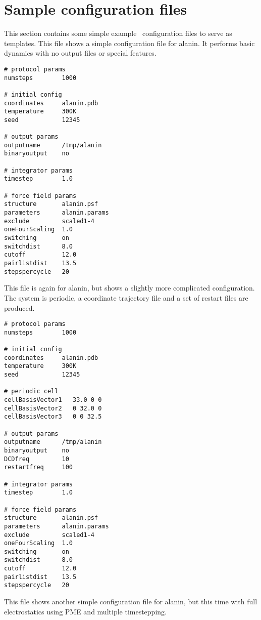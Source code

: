 \section{Sample configuration files}
\label{section:sample}
This section contains some simple example \NAMD\ configuration files to serve
as templates.
\prettypar
This file shows a simple configuration file for alanin.  
It performs basic dynamics
with no output files or special features.

\begin{verbatim}
# protocol params
numsteps        1000

# initial config
coordinates     alanin.pdb
temperature     300K
seed            12345

# output params
outputname      /tmp/alanin
binaryoutput    no

# integrator params
timestep        1.0

# force field params
structure       alanin.psf
parameters      alanin.params
exclude         scaled1-4
oneFourScaling  1.0
switching       on
switchdist      8.0
cutoff          12.0
pairlistdist    13.5
stepspercycle   20
\end{verbatim}

\newpage
This file is again for alanin, 
but shows a slightly more complicated configuration.  
The system is periodic, a coordinate trajectory file
and a set of restart files are produced.

\begin{verbatim}
# protocol params
numsteps        1000

# initial config
coordinates     alanin.pdb
temperature     300K
seed            12345

# periodic cell
cellBasisVector1   33.0 0 0
cellBasisVector2   0 32.0 0
cellBasisVector3   0 0 32.5

# output params
outputname      /tmp/alanin
binaryoutput    no
DCDfreq         10
restartfreq     100

# integrator params
timestep        1.0

# force field params
structure       alanin.psf
parameters      alanin.params
exclude         scaled1-4
oneFourScaling  1.0
switching       on
switchdist      8.0
cutoff          12.0
pairlistdist    13.5
stepspercycle   20
\end{verbatim}

\newpage
This file shows another simple configuration file for alanin, 
but this time with full electrostatics using PME and 
multiple timestepping.

